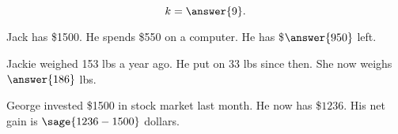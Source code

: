 \documentclass{ximera}
\begin{document}
\begin{problem}

\begin{image}
\end{image}

$$k=\answer{9}.$$
\end{problem}

\begin{problem}
Jack has \$1500. He spends \$550 on a computer. He has \$$\answer{950}$ left.
\end{problem}


\begin{problem}
Jackie weighed 153 lbs a year ago. He put on 33 lbs since then. She now weighs $\answer{186}$ lbs.
\end{problem}


\begin{problem}
George invested \$1500 in stock market last month. He now has \$$1236$. His net gain is $\sage{1236-1500}$ dollars.
\end{problem}
\end{document}
